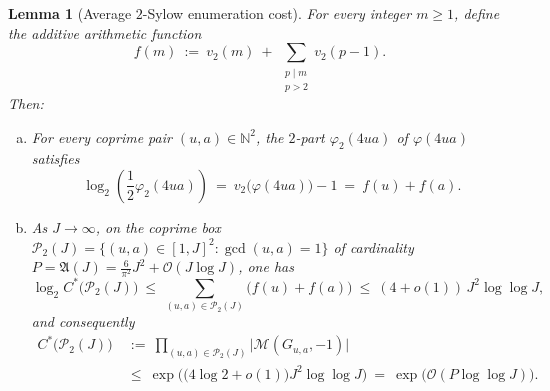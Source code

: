 \documentclass[11pt, a4paper]{article}
\theoremstyle{plain}
\newtheorem{lemma}[theorem]{Lemma}
\theoremstyle{definition}
\newcommand{\N}{\mathbb{N}}
\begin{document}
\begin{lemma}[Average $2$-Sylow enumeration cost]\label{lem:average_2sylow_enumeration}
For every integer $m\ge1$, define the additive arithmetic function
$$f(m)\ :=\ v_2(m)\ +\ \sum_{\substack{p\mid m\\ p>2}}v_2(p-1).$$
Then:
\begin{enumerate}[(a)]
    \item For every coprime pair $(u,a)\in\N^{2}$, the $2$-part $\varphi_2(4ua)$ of $\varphi(4ua)$ satisfies
    \begin{equation}\label{eq:exact_v2_phi}
    \log_2\!\left(\frac12\varphi_2(4ua)\right)\ =\ v_2\big(\varphi(4ua)\big)-1\ =\ f(u)+f(a).
    \end{equation}
    \item As $J\to\infty$, on the coprime box $\mathcal{P}_2(J)=\{(u,a)\in[1,J]^{2}:\gcd(u,a)=1\}$ of cardinality $P=\mathfrak{A}(J)=\frac{6}{\pi^{2}}J^{2}+\mathcal{O}(J\log J)$, one has
    \begin{equation}\label{eq:Cstar_full_family_bound}
    \log_2 C^{\ast}\big(\mathcal{P}_2(J)\big)\ \le\ \sum_{(u,a)\in\mathcal{P}_2(J)}\big(f(u)+f(a)\big)\ \le\ (4+o(1))\,J^{2}\log\log J,
    \end{equation}
    and consequently
    \begin{equation}\label{eq:Cstar_exponential_form}
    \begin{split}
    C^{\ast}\big(\mathcal{P}_2(J)\big)\ &:=\ \prod_{(u,a)\in\mathcal{P}_2(J)}\big|\mathcal{M}(G_{u,a},-1)\big|\\
    &\le\ \exp\!\Big(\big(4\log 2+o(1)\big)J^{2}\log\log J\Big)\ =\ \exp\!\big(\mathcal{O}(P\log\log J)\big).
    \end{split}
    \end{equation}
\end{enumerate}
\end{lemma}
\end{document}
